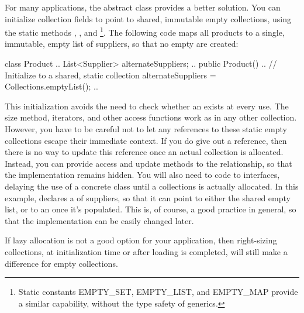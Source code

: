 For many applications, the abstract
 class provides a better solution. You can initialize
collection fields to point to shared, immutable empty collections, using the
static methods , , and 
\footnote{Static constants EMPTY\_SET, EMPTY\_LIST, and EMPTY\_MAP provide a similar capability,
without the type safety of generics.}.
The following code
maps all products to a single, immutable, empty list of suppliers, so that no
empty  are created:

\begin{shortlisting}
class Product {
	.. 
	List<Supplier> alternateSuppliers;
	..
	public Product() {
		..
		// Initialize to a shared, static collection
		alternateSuppliers = Collections.emptyList();
		..
	}
}
\end{shortlisting}

This initialization avoids the need to check whether an 
exists at every use. The size method, iterators, and other access functions
work as in any other collection.
However, you have to be careful not to let any references to these static empty
collections escape their immediate context. If you do give out a reference, 
then there is no way to update this reference once an actual collection is
allocated. Instead, you can provide access and update methods to the relationship,
so that the implementation remains hidden.
You will also need to code to interfaces, delaying the use of a concrete class
until a collections is actually allocated. In this example, 
declares a  of suppliers, so that it can point to either the shared
empty list, or to an  once it's populated.
This is, of course, a good practice in general, so that the implementation can
be easily changed later.

If lazy allocation is not a good option for your application, then
right-sizing collections, at initialization time or after loading is
completed, will still make a difference for empty collections.

